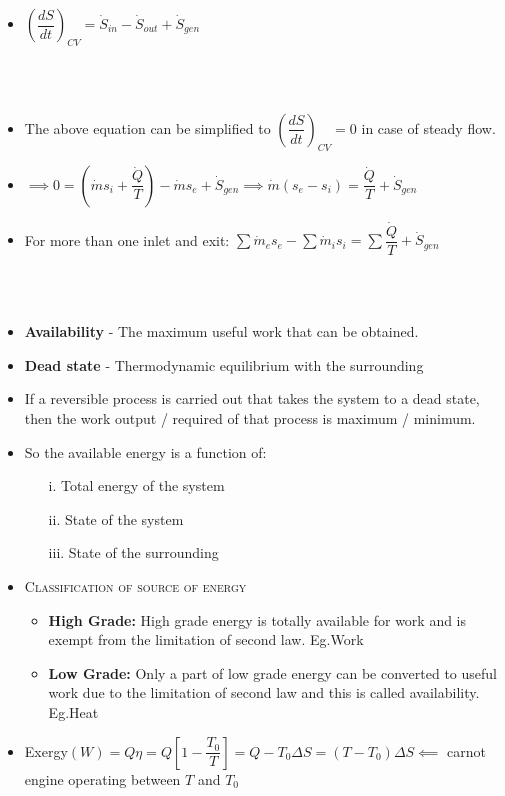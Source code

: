 \documentclass[8pt]{article}
\begin{document}
	\begin{itemize}
		\item $\left(\dfrac{dS}{dt}\right)_{CV} = \dot{S}_{in} - \dot{S}_{out} + \dot{S}_{gen}$
	\end{itemize}\hrulefill\\\\
	\begin{itemize}
		\item The above equation can be simplified to $\left(\dfrac{dS}{dt}\right)_{CV} = 0 $ in case of steady flow.
		\item $\implies 0 = \left(\dot{m}s_i + \dfrac{\dot{Q}}{T}\right) - \dot{m}s_e + \dot{S}_{gen}\implies \boxed{\dot{m}(s_e-s_i)=\dfrac{\dot{Q}}{T} + \dot{S}_{gen}}$
		\item For more than one inlet and exit: $\boxed{\sum \dot{m}_es_e - \sum \dot{m}_is_i = \sum \dfrac{\dot{Q}}{T}+\dot{S}_{gen}}$
	\end{itemize}\hrulefill\\\\
	\begin{itemize}
		\item \textbf{Availability} - The maximum useful work that can be obtained. 
		\item \textbf{Dead state} - Thermodynamic equilibrium with the surrounding
		\item If a reversible process is carried out that takes the system to a dead state, then the work output / required of that process is maximum / minimum.  
		\item So the available energy is a function of: 
			\begin{itemize}
				\item [i.] Total energy of the system
				\item [ii.] State of the system
				\item [iii.] State of the surrounding
			\end{itemize}
		\item \textsc{Classification of source of energy}
			\begin{itemize}
				\item \textbf{High Grade:} High grade energy is totally available for work and is exempt from the limitation of second law. Eg.Work
				\item \textbf{Low Grade:} Only a part of low grade energy can be converted to useful work due to the limitation of second law and this is called availability. Eg.Heat
			\end{itemize}
		\item Exergy$(W) = Q\eta = Q\left[1-\dfrac{T_0}{T}\right] = Q-T_0\Delta S = \boxed{(T-T_0)\Delta S} \impliedby$ carnot engine operating between $T$ and $T_0$
	\end{itemize}\hrulefill\\\\
\end{document}
